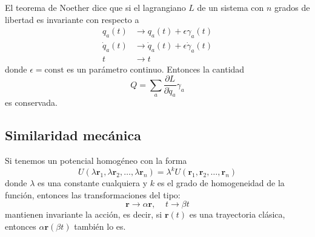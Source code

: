 \documentclass[]{article}
\numberwithin{equation}{section}
\begin{document}
El teorema de Noether dice que si el lagrangiano \(L\) de un sistema con \(n\) grados de libertad es invariante con respecto a
\begin{align*}
	q_a(t) &\rightarrow q_a(t) + \epsilon\gamma_a(t)\\
	\dot{q}_a(t) &\rightarrow \dot{q}_a(t) + \epsilon\dot{\gamma}_a(t)\\
	t &\rightarrow t
\end{align*}
donde \(\epsilon = \mathrm{const}\) es un parámetro continuo. Entonces la cantidad
\begin{equation}
	Q = \sum_{a}\frac{\partial L}{\partial \dot{q}_a}\gamma_a \label{Noether1}
\end{equation}
es conservada.

\subsection{Similaridad mecánica}
Si tenemos un potencial homogéneo con la forma
\begin{equation*}
	U(\lambda\mathbf{r}_1, \lambda\mathbf{r}_2, \ldots, \lambda\mathbf{r}_n) = \lambda^k U(\mathbf{r}_1, \mathbf{r}_2, \ldots, \mathbf{r}_n)
\end{equation*}
donde \(\lambda\) es una constante cualquiera y \(k\) es el grado de homogeneidad de la función, entonces las transformaciones del tipo:
\begin{equation}
	\mathbf{r}\rightarrow\alpha\mathbf{r},\ \ \ \ \ t\rightarrow\beta t\label{r_t_mech_sim}
\end{equation}
mantienen invariante la acción, es decir, si \(\mathbf{r}(t)\) es una trayectoria clásica, entonces \(\alpha\mathbf{r}(\beta t)\) también lo es.
\end{document}
